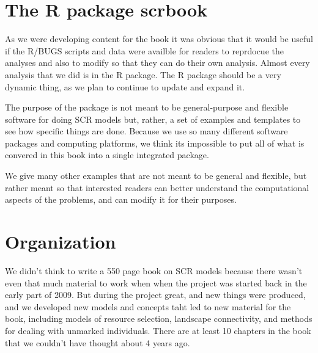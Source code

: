 \section{The R package scrbook}

As we were developing content for the book it was obvious that it
would be useful if the
R/BUGS scripts and data were availble for readers to reprdocue the
analyses and also to modify so that they can do their own analysis. 
Almost every analysis that we did is in the R package. The R package
should be a very dynamic thing, as we plan to 
 continue to update and expand it.

The purpose of the package is  not meant to be general-purpose and
flexible software for doing SCR models but, rather, a set of examples
and templates to see how specific things are done.   Because we use so
many different software packages and computing platforms, we think its
impossible to put all of what is convered in this book into a single
integrated package. 

We give many other examples
that are not meant to be general and flexible, but rather meant so that
 interested readers can better understand the computational
aspects of the problems, and can modify it for their purposes.


\section{Organization}

We didn't
think to write a 550 page book on SCR models because there wasn't even
that much material to work when when the project was started back in
the early part of 2009. But during the project great, and new things were
produced, and we developed new models and concepts taht led to new
material for the book, including models of resource selection,
landscape connectivity, and methods for dealing with unmarked
individuals. There are at least 10 chapters in the book that we
couldn't have thought about 4 years ago. 

